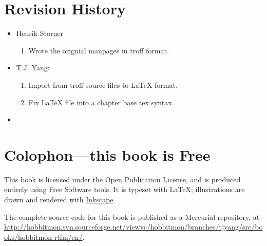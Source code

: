 \section{Revision History}

\begin{itemize}
\item Henrik Storner
 \begin{enumerate}
  \item Wrote the orignial manpages in troff format.
 \end{enumerate}

\item T.J. Yang:
 \begin{enumerate}
  \item Import from troff source files to LaTeX format.
  \item Fix LaTeX file into a chapter base tex syntax.
 \end{enumerate}
\item 
\end{itemize}

\section{Colophon---this book is Free}

This book is licensed under the Open Publication License, and is
produced entirely using Free Software tools.  It is typeset with
\LaTeX{}; illustrations are drawn and rendered with
\href{http://www.inkscape.org/}{Inkscape}.

The complete source code for this book is published as a Mercurial
repository, at \url{http://hobbitmon.svn.sourceforge.net/viewvc/hobbitmon/branches/tjyang/src/books/hobbitmon-rtfm/en/}.

